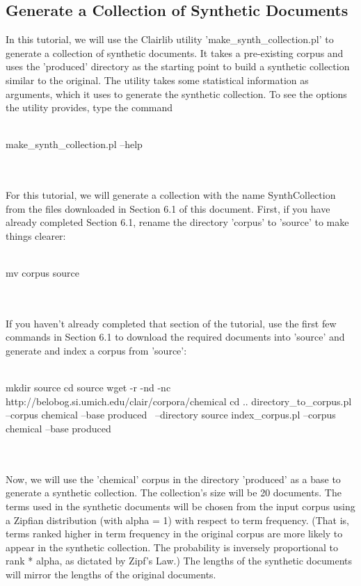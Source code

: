 \subsection{Generate a Collection of Synthetic Documents}
In this tutorial, we will use the Clairlib utility 'make\_synth\_collection.pl' to generate a collection of synthetic documents. It takes a pre-existing corpus and uses the 'produced' directory as the starting point to build a synthetic collection similar to the original. The utility takes some statistical information as arguments, which it uses to generate the synthetic collection. To see the options the utility provides, type the command
\\
\\
\begin{boxedverbatim}
make_synth_collection.pl --help
\end{boxedverbatim}
\\
\\
For this tutorial, we will generate a collection with the name SynthCollection from the files downloaded in Section 6.1 of this document. First, if you have already completed Section 6.1, rename the directory 'corpus' to 'source' to make things clearer:
\\
\\
\begin{boxedverbatim}
mv corpus source
\end{boxedverbatim}
\\
\\
If you haven't already completed that section of the tutorial, use the first few commands in Section 6.1 to download the required documents into 'source' and generate and index a corpus from 'source':
\\
\\
\begin{boxedverbatim}
mkdir source
cd source
wget -r -nd -nc http://belobog.si.umich.edu/clair/corpora/chemical
cd ..
directory_to_corpus.pl --corpus chemical --base produced \
 --directory source
index_corpus.pl --corpus chemical --base produced
\end{boxedverbatim}
\\
\\
Now, we will use the 'chemical' corpus in the directory 'produced' as a base to generate a synthetic collection. The collection's size will be 20 documents. The terms used in the synthetic documents will be chosen from the input corpus using a Zipfian distribution (with alpha = 1) with respect to term frequency. (That is, terms ranked higher in term frequency in the original corpus are more likely to appear in the synthetic collection. The probability is inversely proportional to rank * alpha, as dictated by Zipf's Law.) The lengths of the synthetic documents will mirror the lengths of the original documents.
